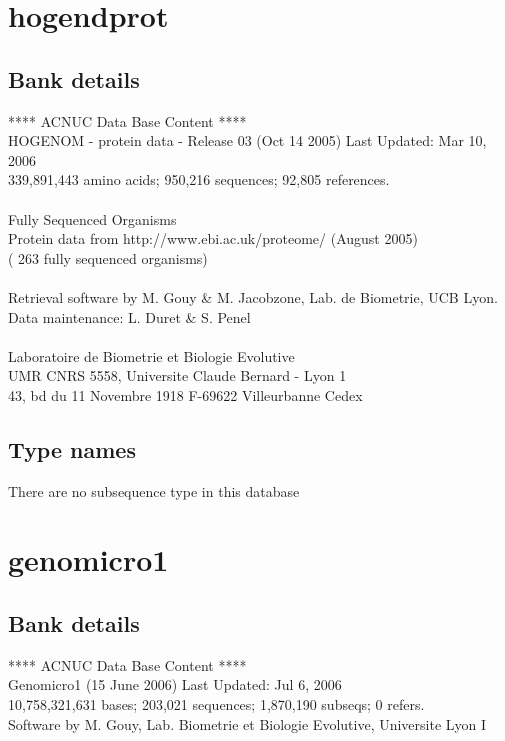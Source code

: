\documentclass{article}
\begin{document}
\begin{Schunk}
\section{ hogendprot }
\subsection{Bank details}
               ****     ACNUC Data Base Content      ****                      \\
  HOGENOM - protein data - Release 03 (Oct 14 2005) Last Updated: Mar 10, 2006\\
          339,891,443 amino acids; 950,216 sequences; 92,805 references.\\
                                                                               \\
                        Fully Sequenced Organisms\\
   Protein data from http://www.ebi.ac.uk/proteome/ (August 2005)\\
	            ( 263 fully sequenced organisms)\\
\\
Retrieval software by M. Gouy \& M. Jacobzone, Lab. de Biometrie, UCB Lyon.\\
Data maintenance: L. Duret \& S. Penel\\
\\
Laboratoire de Biometrie et Biologie Evolutive\\
UMR CNRS 5558, Universite Claude Bernard - Lyon 1 \\
43, bd du 11 Novembre 1918 F-69622 Villeurbanne Cedex\\


\subsection{Type names}
There are no subsequence type in this database
\section{ genomicro1 }
\subsection{Bank details}
             ****     ACNUC Data Base Content      ****                         \\
              Genomicro1 (15 June 2006) Last Updated: Jul  6, 2006\\
10,758,321,631 bases; 203,021 sequences; 1,870,190 subseqs; 0 refers.\\
Software by M. Gouy, Lab. Biometrie et Biologie Evolutive, Universite Lyon I 


\end{Schunk}
\end{document}
